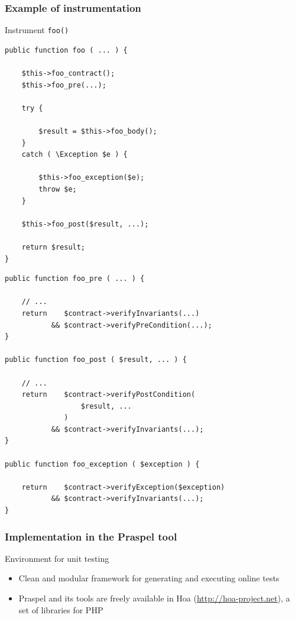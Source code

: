 \documentclass[10pt]{beamer}
\newcommand{\code}[1]{\texttt{#1}}
\begin{document}
\begin{frame}[fragile]
\frametitle{Example of instrumentation}

\begin{exampleblock}{Instrument \code{foo()}}
\begin{multicols}{2}
{
\tiny
\begin{verbatim}
public function foo ( ... ) {

    $this->foo_contract();
    $this->foo_pre(...);

    try {

        $result = $this->foo_body();
    }
    catch ( \Exception $e ) {

        $this->foo_exception($e);
        throw $e;
    }

    $this->foo_post($result, ...);

    return $result;
}
\end{verbatim}
\columnbreak
\begin{verbatim}
public function foo_pre ( ... ) {

    // ...
    return    $contract->verifyInvariants(...)
           && $contract->verifyPreCondition(...);
}

public function foo_post ( $result, ... ) {

    // ...
    return    $contract->verifyPostCondition(
                  $result, ...
              )
           && $contract->verifyInvariants(...);
}

public function foo_exception ( $exception ) {

    return    $contract->verifyException($exception)
           && $contract->verifyInvariants(...);
}
\end{verbatim}
}
\end{multicols}
\end{exampleblock}

\end{frame}

\begin{frame}
\frametitle{Implementation in the Praspel tool}

\begin{block}{Environment for unit testing}
\begin{itemize}
\item Clean and modular framework for generating and executing online tests
\item Praspel and its tools are freely available in Hoa
(\url{http://hoa-project.net}), a set of libraries for PHP
\end{itemize}
\end{block}

\end{frame}
\end{document}
